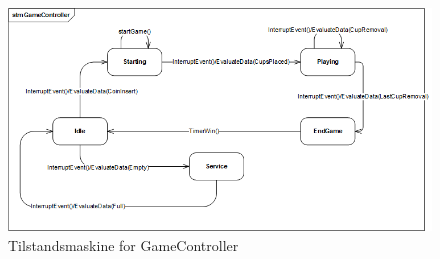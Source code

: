\documentclass[Arkitektur/System_main.tex]{subfiles}
\begin{document}
\begin{figure}[H]
    \centering
    \includegraphics[width=\textwidth]{Arkitektur/Softwarearkitektur/Applikationsmodel/RPi/graphics_RPi/stm_Game.png}
    \caption{Tilstandsmaskine for GameController}
    \label{fig:stm_Game}
\end{figure}
\end{document}
